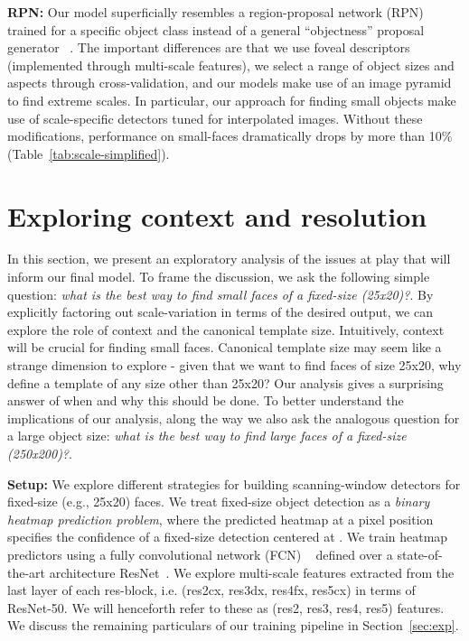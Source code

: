 \documentclass[10pt,twocolumn,letterpaper]{article}
\begin{document}
{\bf RPN: } Our model superficially resembles a region-proposal network (RPN) trained for a specific object class instead of a general ``objectness'' proposal generator ~\cite{ren2015faster}. The important differences are that we use foveal descriptors (implemented through multi-scale features), we select a range of object sizes and aspects through cross-validation, and our models make use of an image pyramid to find extreme scales. In particular, our approach for finding small objects make use of scale-specific detectors tuned for interpolated images. Without these modifications, performance on small-faces dramatically drops by more than 10\% (Table~\ref{tab:scale-simplified}).





\section{Exploring context and resolution}
\label{sec:case}

In this section, we present an exploratory analysis of the issues at play that will inform our final model. To frame the discussion, we ask the following simple question: {\em what is the best way to find small faces of a fixed-size (25x20)?}. By explicitly factoring out scale-variation in terms of the desired output, we can explore the role of context and the canonical template size. Intuitively, context will be crucial for finding small faces. Canonical template size may seem like a strange dimension to explore - given that we want to find faces of size 25x20, why define a template of any size other than 25x20? Our analysis gives a surprising answer of when and why this should be done. To better understand the implications of our analysis, along the way we also ask the analogous question for a large object size: {\em what is the best way to find large faces of a fixed-size (250x200)?}.

{\bf Setup:} We explore different strategies for building scanning-window detectors for  fixed-size (e.g., 25x20) faces. We treat fixed-size object detection as a {\em binary heatmap prediction problem}, where the predicted heatmap at a pixel position  specifies the confidence of a fixed-size detection centered at . We train heatmap predictors using a fully convolutional network (FCN) ~\cite{long2015fully} defined over a state-of-the-art architecture ResNet~\cite{he2015deep}. We explore multi-scale features extracted from the last layer of each res-block, i.e. (res2cx, res3dx, res4fx, res5cx) in terms of ResNet-50. We will henceforth refer to these as (res2, res3, res4, res5) features. We discuss the remaining particulars of our training pipeline in Section~\ref{sec:exp}.
\end{document}
